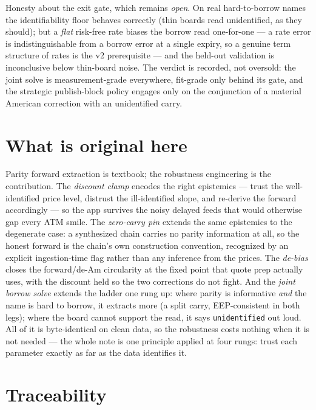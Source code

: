 \documentclass[11pt]{article}
\begin{document}
Honesty about the exit gate, which remains \emph{open}. On real
hard-to-borrow names the identifiability floor behaves correctly (thin
boards read unidentified, as they should); but a \emph{flat} risk-free rate
biases the borrow read one-for-one --- a rate error is indistinguishable
from a borrow error at a single expiry, so a genuine term structure of rates
is the v2 prerequisite --- and the held-out validation is inconclusive below
thin-board noise. The verdict is recorded, not oversold: the joint solve is
measurement-grade everywhere, fit-grade only behind its gate, and the
strategic publish-block policy engages only on the conjunction of a material
American correction with an unidentified carry.

\section{What is original here}
\label{sec:original}

Parity forward extraction is textbook; the robustness engineering is the
contribution. The \emph{discount clamp} encodes the right epistemics --- trust the
well-identified price level, distrust the ill-identified slope, and re-derive the
forward accordingly --- so the app survives the noisy delayed feeds that would
otherwise gap every ATM smile. The \emph{zero-carry pin} extends the same
epistemics to the degenerate case: a synthesized chain carries no parity
information at all, so the honest forward is the chain's own construction
convention, recognized by an explicit ingestion-time flag rather than any
inference from the prices. The \emph{de-bias} closes the forward/de-Am
circularity at the fixed point that quote prep actually uses, with the discount
held so the two corrections do not fight. And the \emph{joint borrow solve}
extends the ladder one rung up: where parity is informative \emph{and} the
name is hard to borrow, it extracts more (a split carry, EEP-consistent in
both legs); where the board cannot support the read, it says
\texttt{unidentified} out loud. All of it is byte-identical on clean data,
so the robustness costs nothing when it is not needed --- the whole note is
one principle applied at four rungs: trust each parameter exactly as far as
the data identifies it.

\section{Traceability}
\label{sec:traceability}
\end{document}
